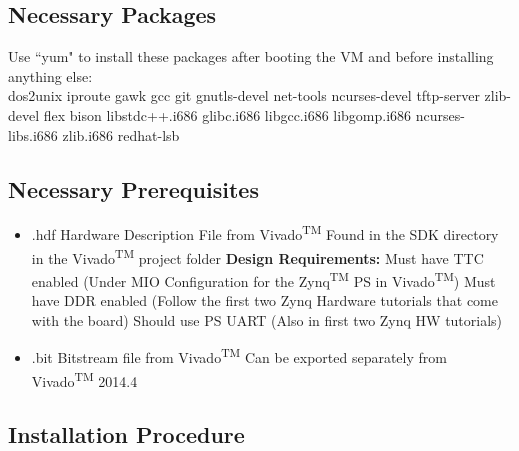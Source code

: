 \subsection{Necessary Packages}
\label{pack}
Use ``yum" to install these packages after booting the VM and before installing anything else: \\
\nohyphens{dos2unix iproute gawk gcc git gnutls-devel net-tools ncurses-devel tftp-server zlib-devel flex bison libstdc++.i686 glibc.i686 libgcc.i686 libgomp.i686 ncurses-libs.i686 zlib.i686 redhat-lsb}

\subsection{Necessary Prerequisites}
\label{prereqs}
\begin{itemize}
\item .hdf Hardware Description File from Vivado\textsuperscript{TM}
\subitem Found in the SDK directory in the Vivado\textsuperscript{TM} project folder
\subitem \textbf{Design Requirements:}
\subitem Must have TTC enabled (Under MIO Configuration for the Zynq\textsuperscript{TM} PS  in Vivado\textsuperscript{TM})
\subitem Must have DDR enabled (Follow the first two Zynq Hardware tutorials that come with the board)
\subitem Should use PS UART (Also in first two Zynq HW tutorials)
\item .bit Bitstream file from Vivado\textsuperscript{TM}
\subitem Can be exported separately from Vivado\textsuperscript{TM} 2014.4
\end{itemize}

\subsection{Installation Procedure}

